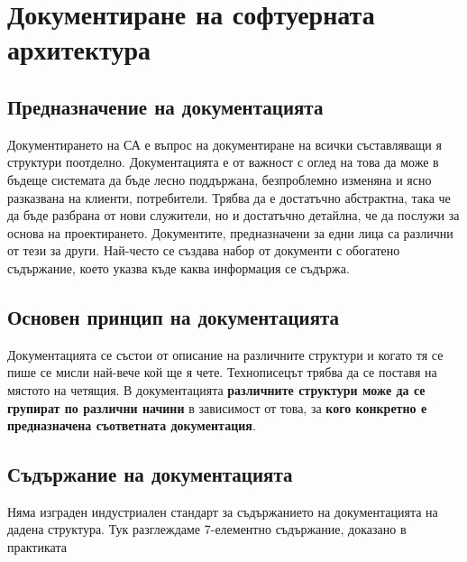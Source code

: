 \documentclass[fleqn,12pt]{article}
\begin{document}
\section{Документиране на софтуерната архитектура}

\subsection{Предназначение на документацията}
Документирането на СА е въпрос на документиране на всички съставляващи я структури поотделно.
Документацията е от важност с оглед на това да може в бъдеще системата да бъде лесно поддържана, безпроблемно изменяна и ясно разказвана на клиенти, потребители.
Трябва да е достатъчно абстрактна, така че да бъде разбрана от нови служители, но и достатъчно детайлна, че да послужи за основа на проектирането. 
\bigbreak
Документите, предназначени за едни лица са различни от тези за други.
Най-често се създава набор от документи с обогатено съдържание, което указва къде каква информация се съдържа.

\subsection{Основен принцип на документацията}

Документацията се състои от описание на различните структури и когато тя се пише се мисли най-вече кой ще я чете.
Технописецът трябва да се поставя на мястото на четящия.
В документацията \textbf{различните структури може да се групират по различни начини} в зависимост от това, за \textbf{кого конкретно е предназначена съответната документация}.

\subsection{Съдържание на документацията}
Няма изграден индустриален стандарт за съдържанието на документацията на дадена структура. Тук разглеждаме 7-елементно съдържание, доказано в практиката
\end{document}
